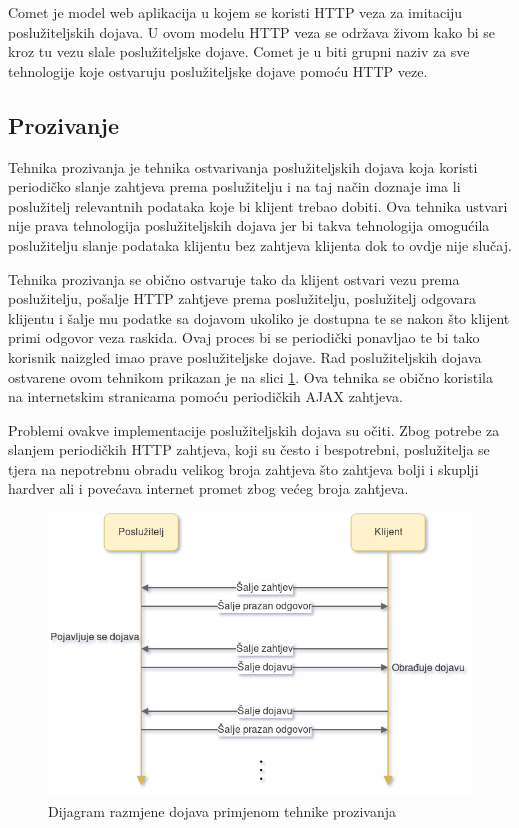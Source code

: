 \documentclass[times, utf8, zavrsni]{fer}
\begin{document}
Comet je model web aplikacija u kojem se koristi HTTP veza za imitaciju poslužiteljskih dojava. U ovom modelu HTTP veza se održava živom kako bi se kroz tu vezu slale poslužiteljske dojave. Comet je u biti grupni naziv za sve tehnologije koje ostvaruju poslužiteljske dojave pomoću HTTP veze.

\subsection{Prozivanje}
Tehnika prozivanja  je tehnika ostvarivanja poslužiteljskih dojava koja koristi periodičko slanje zahtjeva prema poslužitelju i na taj način doznaje ima li poslužitelj relevantnih podataka koje bi klijent trebao dobiti. Ova tehnika ustvari nije prava tehnologija poslužiteljskih dojava jer bi takva tehnologija omogućila poslužitelju slanje podataka klijentu bez zahtjeva klijenta dok to ovdje nije slučaj.

Tehnika prozivanja se obično ostvaruje tako da klijent ostvari vezu prema poslužitelju, pošalje HTTP zahtjeve prema poslužitelju, poslužitelj odgovara klijentu i šalje mu podatke sa dojavom ukoliko je dostupna te se nakon što klijent primi odgovor veza raskida. Ovaj proces bi se periodički ponavljao te bi tako korisnik naizgled imao prave poslužiteljske dojave. Rad poslužiteljskih dojava ostvarene ovom tehnikom prikazan je na slici \ref{fig:polling-image}. Ova tehnika se obično koristila na internetskim stranicama pomoću periodičkih AJAX zahtjeva. 

Problemi ovakve implementacije poslužiteljskih dojava su očiti. Zbog potrebe za slanjem periodičkih HTTP zahtjeva, koji su često i bespotrebni, poslužitelja se tjera na nepotrebnu obradu velikog broja zahtjeva što zahtjeva bolji i skuplji hardver ali i povećava internet promet zbog većeg broja zahtjeva.

\begin{figure}[htb]
\centering
\includegraphics[width=14cm]{img/polling.png}
\caption{Dijagram razmjene dojava primjenom tehnike prozivanja}
\label{fig:polling-image}
\end{figure}
\end{document}
